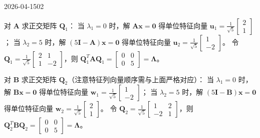 \begin{mistake}{2026-04-15}{02}
\begin{solutioncontent}
对 \(\boldsymbol{A}\) 求正交矩阵 \(\boldsymbol{Q}_1\)：
当 \(\lambda_1 = 0\) 时，解 \(\boldsymbol{Ax}=\boldsymbol{0}\) 得单位特征向量 \(\boldsymbol{u}_1 = \frac{1}{\sqrt{5}}\begin{bmatrix} 2 \\ 1 \end{bmatrix}\)；
当 \(\lambda_2 = 5\) 时，解 \((5\boldsymbol{I}-\boldsymbol{A})\boldsymbol{x}=\boldsymbol{0}\) 得单位特征向量 \(\boldsymbol{u}_2 = \frac{1}{\sqrt{5}}\begin{bmatrix} 1 \\ -2 \end{bmatrix}\)。
令 \(\boldsymbol{Q}_1 = \frac{1}{\sqrt{5}}\begin{bmatrix} 2 & 1 \\ 1 & -2 \end{bmatrix}\)，则 \(\boldsymbol{Q}_1^T\boldsymbol{A}\boldsymbol{Q}_1 = \begin{bmatrix} 0 & 0 \\ 0 & 5 \end{bmatrix} = \boldsymbol{\Lambda}\)。

对 \(\boldsymbol{B}\) 求正交矩阵 \(\boldsymbol{Q}_2\)（注意特征列向量顺序需与上面严格对应）：
当 \(\lambda_1 = 0\) 时，解 \(\boldsymbol{Bx}=\boldsymbol{0}\) 得单位特征向量 \(\boldsymbol{w}_1 = \frac{1}{\sqrt{5}}\begin{bmatrix} 1 \\ -2 \end{bmatrix}\)；
当 \(\lambda_2 = 5\) 时，解 \((5\boldsymbol{I}-\boldsymbol{B})\boldsymbol{x}=\boldsymbol{0}\) 得单位特征向量 \(\boldsymbol{w}_2 = \frac{1}{\sqrt{5}}\begin{bmatrix} 2 \\ 1 \end{bmatrix}\)。
令 \(\boldsymbol{Q}_2 = \frac{1}{\sqrt{5}}\begin{bmatrix} 1 & 2 \\ -2 & 1 \end{bmatrix}\)，则 \(\boldsymbol{Q}_2^T\boldsymbol{B}\boldsymbol{Q}_2 = \begin{bmatrix} 0 & 0 \\ 0 & 5 \end{bmatrix} = \boldsymbol{\Lambda}\)。


\end{solutioncontent}
\end{mistake}
